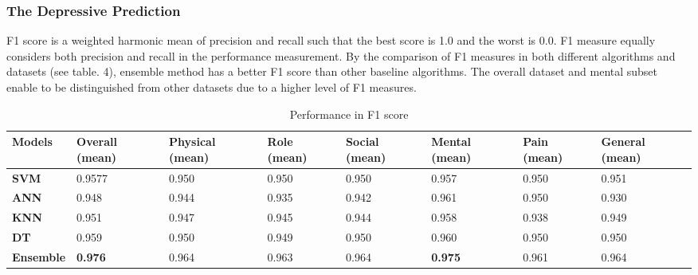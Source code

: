 \documentclass[12pt]{article}
\begin{document}
\subsubsection{The Depressive Prediction}
F1 score is a weighted harmonic mean of precision and recall such that the best score is 1.0 and the worst is 0.0. F1 measure equally considers both precision and recall in the performance measurement. By the comparison of F1 measures in both different algorithms and datasets (see table. 4), ensemble method has a better F1 score than other baseline algorithms. The overall dataset and mental subset enable to be distinguished from other datasets due to a higher level of F1 measures.
\begin{table}[ht]
\begin{adjustwidth}{-1.5cm}{}
\begin{tabular}{|C{2cm}|C{1.5cm}|C{2cm}|C{1.5cm}|C{1.5cm}|C{1.5cm}|C{1.5cm}|C{2cm}|}
\hline
{} 
{\color[HTML]{333333} \textbf{Models}} & {\color[HTML]{333333} \textbf{Overall (mean)}} & {\color[HTML]{333333} \textbf{Physical (mean)}} & {\color[HTML]{333333} \textbf{Role (mean)}} &{\color[HTML]{333333} \textbf{Social (mean)}} & {\color[HTML]{333333} \textbf{Mental (mean)}} & {\color[HTML]{333333} \textbf{Pain (mean)}} & {\color[HTML]{333333} \textbf{General (mean)}} \\ \hline
{} 
\textbf{SVM} & 0.9577  & 0.950 & 0.950  & 0.950  & 0.957  & 0.950 & 0.951 \\ \hline
{} 
\textbf{ANN} & 0.948  & 0.944  & 0.935  & 0.942 & 0.961 & 0.950 & 0.930 \\ \hline
{} 
\textbf{KNN} & 0.951  & 0.947 & 0.945 & 0.944 & 0.958 & 0.938 & 0.949 \\ \hline
{} 
\textbf{DT} & 0.959 & 0.950  & 0.949 & 0.950  & 0.960  & 0.950 & 0.950  \\ \hline
{} 
\textbf{Ensemble}  & \textbf{0.976}  & 0.964  & 0.963  & 0.964 & \textbf{0.975} & 0.961 & 0.964  \\ \hline
\end{tabular}
\caption{Performance in F1 score}
\label{F1}
\end{adjustwidth}
\end{table}
\end{document}
